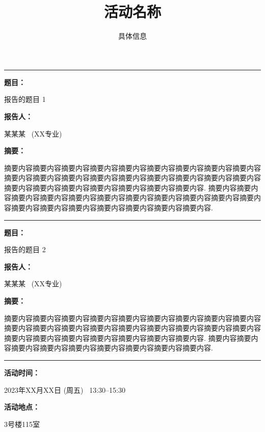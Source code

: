 \documentclass[a4paper,AutoFakeBold]{ctexart}
\title{活动名称}
\author{具体信息}
\newenvironment{point}[1][]{%
  {\noindent\kaishu\bfseries#1：}\ignorespaces%
}{%
  \par\smallskip%
}
\newenvironment{block}[1][]{%
  {\noindent\kaishu\bfseries #1：}%
  \par\smallskip%
  \noindent\ignorespaces%
}{%
  \par\medskip%
}
\begin{document}
\maketitle

\hrule
\vspace{1.2em}

\begin{point}[题目]
  报告的题目 1
\end{point}

\begin{point}[报告人]
  某某某~ (XX专业)
\end{point}

\begin{point}[摘要]
摘要内容摘要内容摘要内容摘要内容摘要内容摘要内容摘要内容摘要内容摘要内容摘要内容摘要内容摘要内容摘要内容摘要内容摘要内容摘要内容摘要内容摘要内容摘要内容摘要内容摘要内容摘要内容摘要内容摘要内容摘要内容. 摘要内容摘要内容摘要内容摘要内容摘要内容摘要内容摘要内容摘要内容摘要内容摘要内容摘要内容摘要内容摘要内容摘要内容摘要内容摘要内容摘要内容摘要内容.
\end{point}

\bigskip
\hrule
\vspace{1.5em}

\begin{point}[题目]
  报告的题目 2
\end{point}

\begin{point}[报告人]
  某某某~ (XX专业)
\end{point}

\begin{block}[摘要]
\indent 摘要内容摘要内容摘要内容摘要内容摘要内容摘要内容摘要内容摘要内容摘要内容摘要内容摘要内容摘要内容摘要内容摘要内容摘要内容摘要内容摘要内容摘要内容摘要内容摘要内容摘要内容摘要内容摘要内容摘要内容摘要内容. 摘要内容摘要内容摘要内容摘要内容摘要内容摘要内容摘要内容摘要内容摘要内容.
\end{block}

\bigskip
\hrule
\vspace{1.5em}

\begin{point}[活动时间]
  2023年XX月XX日 (周五)~ 13:30--15:30
\end{point}

\begin{point}[活动地点]
  3号楼115室
\end{point}

\end{document}
